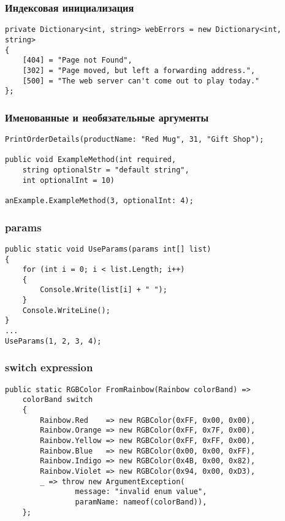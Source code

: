 \documentclass{../../slides-style}
\begin{document}
    \begin{frame}[fragile]
        \frametitle{Индексовая инициализация}
        \begin{verbatim}
private Dictionary<int, string> webErrors = new Dictionary<int, string>
{
    [404] = "Page not Found",
    [302] = "Page moved, but left a forwarding address.",
    [500] = "The web server can't come out to play today."
};
        \end{verbatim}
    \end{frame}

    \begin{frame}[fragile]
        \frametitle{Именованные и необязательные аргументы}
        \begin{verbatim}
PrintOrderDetails(productName: "Red Mug", 31, "Gift Shop");

public void ExampleMethod(int required, 
    string optionalStr = "default string",
    int optionalInt = 10)

anExample.ExampleMethod(3, optionalInt: 4);
        \end{verbatim}
    \end{frame}

    \begin{frame}[fragile]
        \frametitle{params}
        \begin{verbatim}
public static void UseParams(params int[] list)
{
    for (int i = 0; i < list.Length; i++)
    {
        Console.Write(list[i] + " ");
    }
    Console.WriteLine();
}
...
UseParams(1, 2, 3, 4);
        \end{verbatim}
    \end{frame}

    \begin{frame}[fragile]
        \frametitle{switch expression}
        \begin{verbatim}
public static RGBColor FromRainbow(Rainbow colorBand) =>
    colorBand switch
    {
        Rainbow.Red    => new RGBColor(0xFF, 0x00, 0x00),
        Rainbow.Orange => new RGBColor(0xFF, 0x7F, 0x00),
        Rainbow.Yellow => new RGBColor(0xFF, 0xFF, 0x00),
        Rainbow.Blue   => new RGBColor(0x00, 0x00, 0xFF),
        Rainbow.Indigo => new RGBColor(0x4B, 0x00, 0x82),
        Rainbow.Violet => new RGBColor(0x94, 0x00, 0xD3),
        _ => throw new ArgumentException(
                message: "invalid enum value", 
                paramName: nameof(colorBand)),
    };
        \end{verbatim}
    \end{frame}
\end{document}
